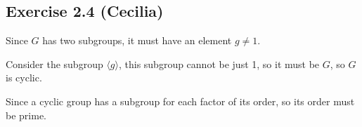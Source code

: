 \subsection*{Exercise 2.4 (Cecilia)}
Since $ G $ has two subgroups, it must have an element $ g \ne 1 $.

Consider the subgroup $ \langle g \rangle $, this subgroup cannot be just 1, so it must be $ G $, so $ G $ is cyclic.

Since a cyclic group has a subgroup for each factor of its order, so its order must be prime.